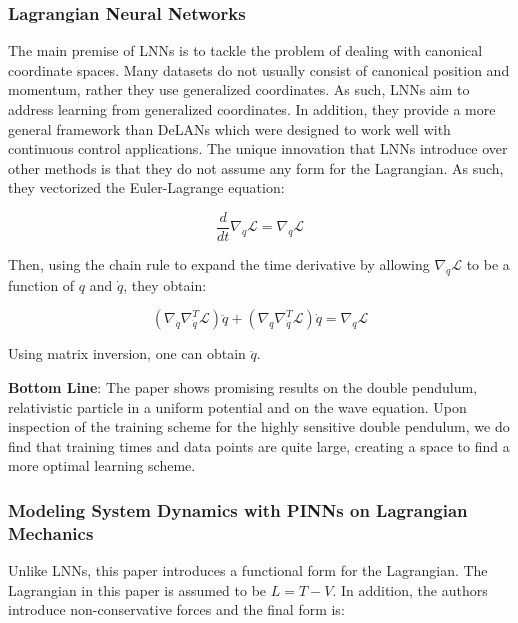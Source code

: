 \documentclass{article}
\begin{document}
\subsubsection{Lagrangian Neural Networks}

The main premise of LNNs \cite{cranmer_lagrangian_2020} is to tackle the problem of dealing with canonical coordinate spaces. Many datasets do not usually consist of canonical position and momentum, rather they use generalized coordinates. As such, LNNs aim to address learning from generalized coordinates. In addition, they provide a more general framework than DeLANs which were designed to work well with continuous control applications. The unique innovation that LNNs introduce over other methods is that they do not assume any form for the Lagrangian. As such, they vectorized the Euler-Lagrange equation:

\begin{equation}
\frac{d}{dt} \nabla_{\dot{q}} \mathcal{L} = \nabla_q \mathcal{L}
\label{eqn.lnn1}
\end{equation}

Then, using the chain rule to expand the time derivative by allowing $\nabla_{\dot{q}}\mathcal{L}$ to be a function of $q$ and $\dot{q}$, they obtain:

\begin{equation}
(\nabla_{\dot{q}}\nabla_{\dot{q}}^T \mathcal{L}) \ddot{q} + (\nabla_q \nabla_{\dot{q}}^T \mathcal{L})\dot{q} = \nabla_q \mathcal{L}
\end{equation}

Using matrix inversion, one can obtain $\ddot{q}$. 

\textbf{Bottom Line}: The paper shows promising results on the double pendulum, relativistic particle in a uniform potential and on the wave equation. Upon inspection of the training scheme for the highly sensitive double pendulum, we do find that training times and data points are quite large, creating a space to find a more optimal learning scheme.

\subsubsection{Modeling System Dynamics with PINNs on Lagrangian Mechanics}

Unlike LNNs, this paper introduces a functional form for the Lagrangian. The Lagrangian in this paper \cite{roehrl_modeling_2020} is assumed to be $L = T -V$. In addition, the authors introduce non-conservative forces and the final form is:
\end{document}
